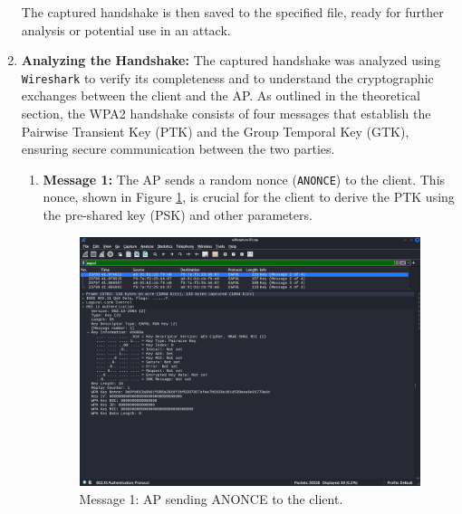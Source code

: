 \begin{enumerate}
    The captured handshake is then saved to the specified file, ready for further analysis or potential use in an attack.

    \item \textbf{Analyzing the Handshake:} The captured handshake was analyzed using \texttt{Wireshark} to verify its completeness and to understand the cryptographic exchanges between the client and the AP. As outlined in the theoretical section, the WPA2 handshake consists of four messages that establish the Pairwise Transient Key (PTK) and the Group Temporal Key (GTK), ensuring secure communication between the two parties.

\begin{enumerate}
    \item \textbf{Message 1:} The AP sends a random nonce (\texttt{ANONCE}) to the client. This nonce, shown in Figure \ref{fig:msg1}, is crucial for the client to derive the PTK using the pre-shared key (PSK) and other parameters.
    \begin{figure}[h!]
        \centering
        \includegraphics[width=0.8\linewidth]{images/msg1.png}
        \caption{Message 1: AP sending ANONCE to the client.}
        \label{fig:msg1}
    \end{figure}


\end{enumerate}
\end{enumerate}

